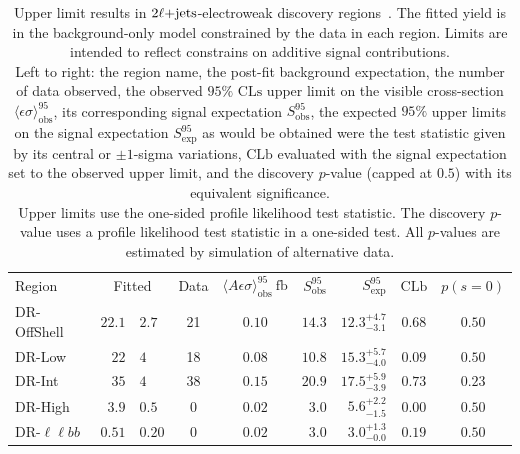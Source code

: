 \FloatBarrier
\begin{table}[tp]
\centering
\begin{tabular*}{\textwidth}{lr@{$~\pm~$}lccrrcc}
Region &
\multicolumn{2}{c}{Fitted} &
Data &
$\langle A\epsilon{ \sigma}\rangle_{\mathrm{obs}}^{95}~\mathrm{fb}$ &
$S_{\mathrm{obs}}^{95}$  &
$S_{\mathrm{exp}}^{95}$ &
$\mathrm{CLb}$ &
$p(s=0)$  \\[1.5ex]
DR-OffShell      & $22.1$ & $2.7$ & 21 & $0.10$ & $14.3$ & $12.3^{+4.7}_{-3.1}$ & $0.68$ & $0.50$ \\[.5ex]
DR-Low           & $22$ & $4$ & 18 & $0.08$ & $10.8$ & $15.3^{+5.7}_{-4.0}$ & $0.09$ & $0.50$ \\[.5ex]
DR-Int           & $35$ & $4$ & 38 & $0.15$ & $20.9$ & $17.5^{+5.9}_{-3.9}$ & $0.73$ & $0.23$ \\[.5ex]
DR-High          & $3.9$ & $0.5$  & 0  & $0.02$ & $3.0$ & $5.6^{+2.2}_{-1.5}$ & $0.00$ & $0.50$ \\[.5ex]
DR-$\ell\ell bb$ & $0.51$ & $0.20$  & 0  & $0.02$ & $3.0$ & $3.0^{+1.3}_{-0.0}$ & $0.19$ & $0.50$ \\[.5ex]
\end{tabular*}
\caption{%
Upper limit results in $2\ell\mathrm{+jets}$-electroweak discovery
regions~\cite{atlas2022searches}.
The fitted yield is in the background-only model constrained by the data in each region.
Limits are intended to reflect constrains on additive signal contributions.
\\[0.5em]
Left to right:
the region name,
the post-fit background expectation,
the number of data observed,
the observed $95\%$ $\mathrm{CLs}$ upper limit on the visible cross-section
$\langle\epsilon\sigma\rangle_\mathrm{obs}^{95}$,
its corresponding signal expectation $S_\mathrm{obs}^{95}$,
the expected $95\%$ upper limits on the signal expectation $S_\mathrm{exp}^{95}$
as would be obtained were the test statistic given by its central or
$\pm1$-sigma variations,
$\mathrm{CLb}$ evaluated with the signal expectation set to the observed upper limit,
and the discovery $p$-value (capped at $0.5$) with its equivalent significance.
\\[0.5em]
Upper limits use the one-sided profile likelihood test statistic.
The discovery $p$-value uses a profile likelihood test statistic in a one-sided test.
All $p$-values are estimated by simulation of alternative data.
}
\label{tab:2ljets_discovery}
\end{table}

